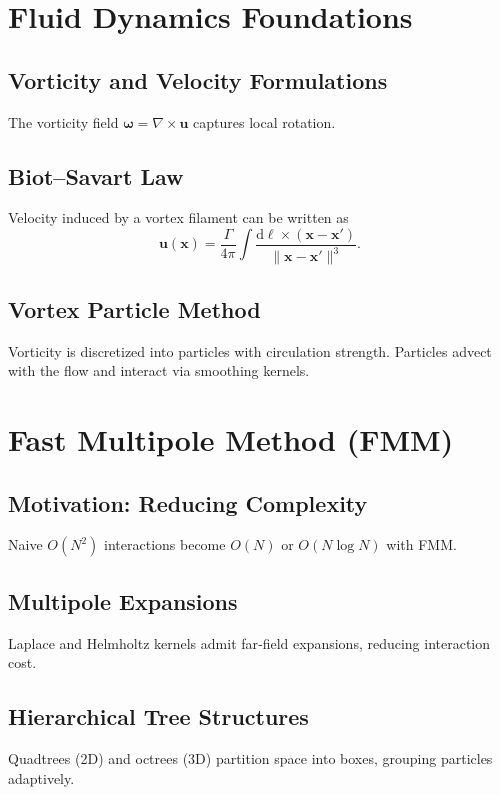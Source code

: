 \documentclass[conf]{new-aiaa} %
\begin{document}
\section{Fluid Dynamics Foundations}

\subsection{Vorticity and Velocity Formulations}
The vorticity field $\boldsymbol{\omega} = \nabla \times \mathbf{u}$ captures local rotation.  

\subsection{Biot--Savart Law}
Velocity induced by a vortex filament can be written as
\[
\mathbf{u}(\mathbf{x}) = \frac{\Gamma}{4 \pi} \int \frac{\mathrm{d}\boldsymbol{\ell} \times (\mathbf{x}-\mathbf{x}')}{\|\mathbf{x}-\mathbf{x}'\|^3}.
\]

\subsection{Vortex Particle Method}
Vorticity is discretized into particles with circulation strength.  
Particles advect with the flow and interact via smoothing kernels.

\section{Fast Multipole Method (FMM)}

\subsection{Motivation: Reducing Complexity}
Naive $O(N^2)$ interactions become $O(N)$ or $O(N \log N)$ with FMM.

\subsection{Multipole Expansions}
Laplace and Helmholtz kernels admit far‐field expansions, reducing interaction cost.

\subsection{Hierarchical Tree Structures}
Quadtrees (2D) and octrees (3D) partition space into boxes, grouping particles adaptively.
\end{document}
